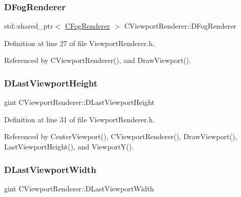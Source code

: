 \subsubsection{\texorpdfstring{D\+Fog\+Renderer}{DFogRenderer}}
{\footnotesize\ttfamily std\+::shared\+\_\+ptr$<$ \hyperlink{classCFogRenderer}{C\+Fog\+Renderer} $>$ C\+Viewport\+Renderer\+::\+D\+Fog\+Renderer\hspace{0.3cm}{\ttfamily [protected]}}



Definition at line 27 of file Viewport\+Renderer.\+h.



Referenced by C\+Viewport\+Renderer(), and Draw\+Viewport().

\hypertarget{classCViewportRenderer_aaca5c330615fc2aacc57dede8e7c18b0}{}\label{classCViewportRenderer_aaca5c330615fc2aacc57dede8e7c18b0} 
\subsubsection{\texorpdfstring{D\+Last\+Viewport\+Height}{DLastViewportHeight}}
{\footnotesize\ttfamily gint C\+Viewport\+Renderer\+::\+D\+Last\+Viewport\+Height\hspace{0.3cm}{\ttfamily [protected]}}



Definition at line 31 of file Viewport\+Renderer.\+h.



Referenced by Center\+Viewport(), C\+Viewport\+Renderer(), Draw\+Viewport(), Last\+Viewport\+Height(), and Viewport\+Y().

\hypertarget{classCViewportRenderer_aaa21acd1b43badc3c1a3b0bf9b0f86f9}{}\label{classCViewportRenderer_aaa21acd1b43badc3c1a3b0bf9b0f86f9} 
\subsubsection{\texorpdfstring{D\+Last\+Viewport\+Width}{DLastViewportWidth}}
{\footnotesize\ttfamily gint C\+Viewport\+Renderer\+::\+D\+Last\+Viewport\+Width\hspace{0.3cm}{\ttfamily [protected]}}



